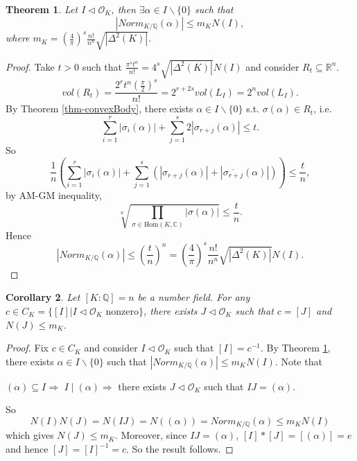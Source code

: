 \documentclass[11pt]{book}
\newtheorem{theorem}{Theorem}[section]
\newtheorem{corollary}[theorem]{Corollary}
\begin{document}
\begin{theorem}\label{thm-MinkowskiBound}
    Let $I\lhd \mathcal{O}_{K}$, then $\exists \alpha\in I\backslash \{0\}$ such that 
    \[
    \left| Norm_{K /\mathbb{Q}} (\alpha)\right| \leq m_{K}N(I),
    \]
    where $m_{K}=(\frac{4}{\pi})^{s}\frac{n!}{n^{n}}\sqrt{\left| \Delta^{2}(K) \right| }$. 
\end{theorem}

\begin{proof}
    Take $t>0$ such that $\frac{\pi^{s}t^{n}}{n!}=4^{s}\sqrt{\left| \Delta^{2}(K) \right| }N(I)$ and consider $R_{t}\subseteq \mathbb{R}^{n}$. 
    \[vol(R_{t})=\frac{2^{r}t^{n}(\frac{\pi}{2})^{s}}{n!}=2^{r+2s}vol(L_{I})=2^{n}vol(L_{I}).\]
    By Theorem \ref{thm-convexBody}, there exists $\alpha\in I\backslash \{0\}$ s.t. $\sigma(\alpha)\in R_{t}$, i.e. 
    \[
    \sum_{i=1}^{r}\left| \sigma_{i}(\alpha) \right| +\sum_{j=1}^{s}2\left| \sigma_{r+j}(\alpha) \right|\leq t. 
    \]
    So 
    \[
    \frac{1}{n}\left(\sum_{i=1}^{r}\left| \sigma_{i}(\alpha) \right| +\sum_{j=1}^{s}(\left| \sigma_{r+j}(\alpha) \right|+\left| \overline{\sigma_{r+j}}(\alpha)\right|)\right) \leq \frac{t}{n},
    \]
    by AM-GM inequality, 
    \[\sqrt[n]{\prod_{\sigma\in \mathrm{Hom}(K,\mathbb{C})}\left| \sigma(\alpha) \right| }\leq \frac{t}{n}. \]
    Hence 
    \[
    \left| Norm_{K /\mathbb{Q}}(\alpha)\right|\leq (\frac{t}{n})^{n}=(\frac{4}{\pi})^{s}\frac{n!}{n^{n}}\sqrt{\left| \Delta^{2}(K) \right| }N(I). 
    \]
\end{proof}

\begin{corollary}
    Let $[K:\mathbb{Q}]=n$ be a number field. For any $c\in C_{K}=\{[I]|I\lhd\mathcal{O}_{K}\text{ nonzero}\}$, there exists $J\lhd \mathcal{O}_{K}$ such that $c=[J]$ and $N(J)\leq m_{K}$. 
\end{corollary}

\begin{proof}
    Fix $c\in C_{K}$ and consider $I\lhd \mathcal{O}_{K}$ such that $[I]=c^{-1}$. By Theorem \ref{thm-MinkowskiBound}, there exists $\alpha\in I\backslash \{0\}$ such that $\left| Norm_{K /\mathbb{Q}}(\alpha) \right| \leq m_{K}N(I)$. Note that 
    \begin{center}
    $(\alpha)\subseteq I$\quad  $\Rightarrow$ \quad $I\mid (\alpha)$\quad  $\Rightarrow$ \quad  there exists $J\lhd \mathcal{O}_{K}$ such that $IJ=(\alpha)$.    
    \end{center}
    So 
    \[
    N(I)N(J)=N(IJ)=N((\alpha)) = Norm_{K /\mathbb{Q}}(\alpha)\leq m_{K}N(I)
    \] 
    which gives $N(J)\leq m_{K}$. Moreover, since $IJ = (\alpha)$, $[I]*[J] = [(\alpha)] = e$ and hence $[J]=[I]^{-1}=c$. So the result follows.
\end{proof}
\end{document}
